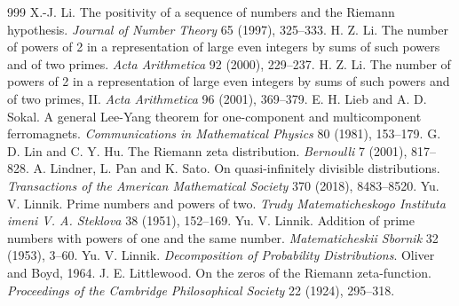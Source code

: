 \begin{thebibliography}{999}
 X.-J. Li. The positivity of a sequence of numbers and the Riemann hypothesis. \emph{Journal of Number Theory} 65 (1997), 325--333.
 H. Z. Li. The number of powers of 2 in a representation of large even integers by sums of such powers and of two primes. \emph{Acta Arithmetica} 92 (2000), 229--237.
 H. Z. Li. The number of powers of 2 in a representation of large even integers by sums of such powers and of two primes, II. \emph{Acta Arithmetica} 96 (2001), 369--379.
 E. H. Lieb and A. D. Sokal. A general Lee-Yang theorem for one-component and multicomponent ferromagnets. \emph{Communications in Mathematical Physics} 80 (1981), 153--179.
 G. D. Lin and C. Y. Hu. The Riemann zeta distribution. \emph{Bernoulli} 7 (2001), 817--828.
 A. Lindner, L. Pan and K. Sato. On quasi-infinitely divisible distributions. \emph{Transactions of the American Mathematical Society} 370 (2018), 8483--8520.
 Yu. V. Linnik. Prime numbers and powers of two. \emph{Trudy Matematicheskogo Instituta imeni V. A. Steklova} 38 (1951), 152--169.
 Yu. V. Linnik. Addition of prime numbers with powers of one and the same number. \emph{Matematicheskii Sbornik} 32 (1953), 3--60.
 Yu. V. Linnik. \emph{Decomposition of Probability Distributions}. Oliver and Boyd, 1964.
 J. E. Littlewood. On the zeros of the Riemann zeta-function. \emph{Proceedings of the Cambridge Philosophical Society} 22 (1924), 295--318.

\end{thebibliography}
